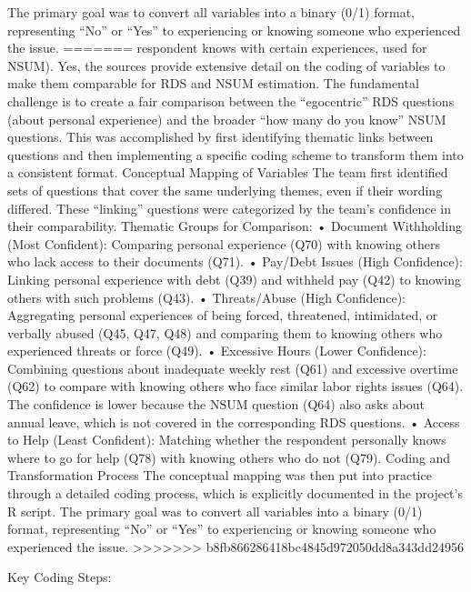 \documentclass[
  12pt,
  letterpaper,
  DIV=11,
  numbers=noendperiod]{scrartcl}
\theoremstyle{plain}
\theoremstyle{definition}
\begin{document}
{The primary goal was to convert all variables into a binary (0/1)
format, representing ``No'' or ``Yes'' to experiencing or knowing
someone who experienced the issue.
=======
respondent knows with certain experiences, used for NSUM). Yes, the
sources provide extensive detail on the coding of variables to make them
comparable for RDS and NSUM estimation. The fundamental challenge is to
create a fair comparison between the ``egocentric'' RDS questions (about
personal experience) and the broader ``how many do you know'' NSUM
questions. This was accomplished by first identifying thematic links
between questions and then implementing a specific coding scheme to
transform them into a consistent format. Conceptual Mapping of Variables
The team first identified sets of questions that cover the same
underlying themes, even if their wording differed. These ``linking''
questions were categorized by the team's confidence in their
comparability. Thematic Groups for Comparison: • Document Withholding
(Most Confident): Comparing personal experience (Q70) with knowing
others who lack access to their documents (Q71). • Pay/Debt Issues (High
Confidence): Linking personal experience with debt (Q39) and withheld
pay (Q42) to knowing others with such problems (Q43). • Threats/Abuse
(High Confidence): Aggregating personal experiences of being forced,
threatened, intimidated, or verbally abused (Q45, Q47, Q48) and
comparing them to knowing others who experienced threats or force (Q49).
• Excessive Hours (Lower Confidence): Combining questions about
inadequate weekly rest (Q61) and excessive overtime (Q62) to compare
with knowing others who face similar labor rights issues (Q64). The
confidence is lower because the NSUM question (Q64) also asks about
annual leave, which is not covered in the corresponding RDS questions. •
Access to Help (Least Confident): Matching whether the respondent
personally knows where to go for help (Q78) with knowing others who do
not (Q79). Coding and Transformation Process The conceptual mapping was
then put into practice through a detailed coding process, which is
explicitly documented in the project's R script. The primary goal was to
convert all variables into a binary (0/1) format, representing ``No'' or
``Yes'' to experiencing or knowing someone who experienced the issue.
>>>>>>> b8fb866286418bc4845d972050dd8a343dd24956

Key Coding Steps:

}
\end{document}
